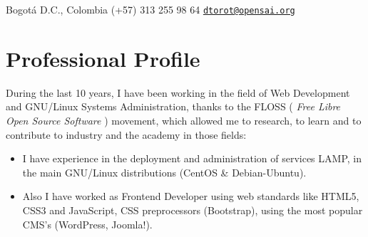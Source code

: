 \documentclass[overlapped,line,final]{res}
\begin{document}

\begin{resume}


	\begin{minipage}{0.5\linewidth}
    		Bogotá D.C., Colombia \newline
    		(+57) 313 255 98 64 \newline
		{\tt \href{mailto:dtorot@opensai.org}{dtorot@opensai.org}}
	\end{minipage}


\vspace{0.5cm}
\section{\sc Professional Profile}
\vspace{0.5cm}
During the last 10 years, I have been working in the field of Web Development and GNU/Linux Systems Administration, thanks to the FLOSS ( {\em Free Libre Open Source Software } ) movement, which allowed me to research, to learn and to contribute to industry and the academy in those fields:

\vspace{2mm}
\begin{itemize}
    \item I have experience in the deployment and administration of services LAMP, in the main GNU/Linux distributions (CentOS \& Debian-Ubuntu). 

    \item Also I have worked as Frontend Developer using web standards like HTML5, CSS3 and JavaScript, CSS preprocessors (Bootstrap), using the most popular CMS's (WordPress, Joomla!).


\end{itemize}
\end{resume}
\end{document}

